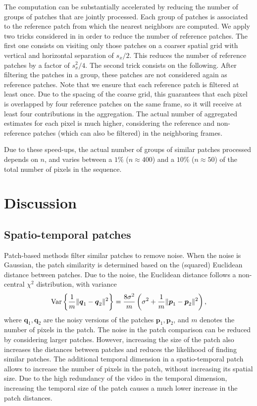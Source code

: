 \documentclass[10pt, a4paper]{article}
\newcommand{\pcomment}[1]{}
\newcommand{\ma}[1]{\boldsymbol{#1}}
\begin{document}
The computation can be substantially accelerated by reducing the 
number of groups of patches that are jointly processed.
Each group of patches is associated to the reference patch from which 
the nearest neighbors are computed.
We apply two tricks
considered in \cite{Dabov2007tip,Lebrun2013ipol} in order to reduce the number of reference patches. 
The first one consists on visiting only 
those patches on a coarser spatial grid with vertical and horizontal separation
of $s_x/2$. This reduces the number of reference patches by a factor of
$s_x^2/4$. The second trick consists on the following.  After
filtering the patches in a group, these patches are not considered again
as reference patches. 
Note that we ensure that each reference patch is filtered at least once. 
Due to the spacing of the coarse grid, this guarantees that each pixel is
overlapped by four reference patches on the same frame, so it will receive at
least four contributions in the aggregation. The actual number of aggregated
estimates for each pixel is much higher, considering the reference and
non-reference patches (which can also be filtered) in the neighboring frames.

Due to these speed-ups, the actual number of groups of similar patches processed
depends on $n$, and varies between a $1\%$ ($n \approx 400$)  and a $10\%$ ($n
\approx 50$) of the total number of pixels in the sequence. 
\pcomment{Check this numbers!}


\section{Discussion}
\label{sec:discussion}

\subsection{Spatio-temporal patches}
\label{sse:spatio-temporal-patches}
Patch-based methods filter similar patches to remove noise. When the noise is
Gaussian, the patch similarity is determined based on the (squared) Euclidean distance 
between patches. Due to the noise, the Euclidean distance follows a non-central
$\chi^2$ distribution, with variance
\[\textnormal{Var}\left\{\frac1{m}\|\ma q_1 - \ma q_2\|^2\right\} = \frac{8\sigma^2}{m}\left(\sigma^2 + \frac1{m}\|\ma p_1 - \ma p_2\|^2\right),\]
where $\ma q_1, \ma q_2$ are the noisy versions of the patches $\ma p_1, \ma p_2$, 
and $m$ denotes the number of pixels in the patch. The noise in the patch comparison
can be reduced by considering larger patches.
However, increasing the size of the patch also increases the distances between
patches and reduces the likelihood of finding similar patches.
%
The additional temporal dimension in a spatio-temporal patch allows to increase
the number of pixels in the patch, without increasing its spatial size.
Due to the high redundancy of the video in the temporal dimension, increasing the 
temporal size of the patch causes a much lower increase in the patch distances.
%
\end{document}
